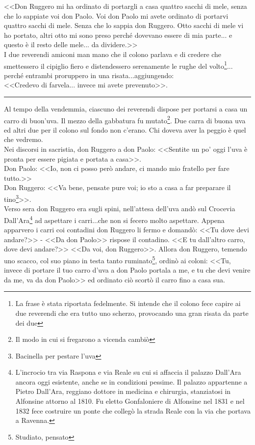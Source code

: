 \indent <<Don Ruggero mi ha ordinato di portargli a casa quattro sacchi di mele, senza che lo sappiate voi don Paolo. Voi don Paolo mi avete ordinato di portarvi quattro sacchi di mele. Senza che lo sappia don Ruggero. Otto sacchi di mele vi ho portato, altri otto mi sono preso perché dovevano essere di mia parte... e questo è il resto delle mele... da dividere.>>\\
I due reverendi amiconi man mano che il colono parlava e di credere che smettessero il cipiglio fiero e distendessero serenamente le rughe del volto\footnote{La frase è stata riportata fedelmente. Si intende che il colono fece capire ai due reverendi che era tutto uno scherzo, provocando una gran risata da parte dei due}... perché entrambi proruppero in una risata...aggiungendo: \\
\indent <<Credevo di farvela... invece mi avete prevenuto>>.
\begin{center}
\rule{1.5cm}{0.4pt}
\end{center}
Al tempo della vendemmia, ciascuno dei reverendi dispose per portarsi a casa un carro di buon'uva. Il mezzo della gabbatura fu mutato\footnote{Il modo in cui si fregarono a vicenda cambiò}. Due carra di buona uva ed altri due per il colono sul fondo non c'erano. Chi doveva aver la peggio è quel che vedremo. \\
Nei discorsi in sacristia, don Ruggero a don Paolo: <<Sentite un po' oggi l'uva è pronta per essere pigiata e portata a casa>>.\\
\indent Don Paolo: <<Io, non ci posso però andare, ci mando mio fratello per fare tutto.>>\\
\indent Don Ruggero: <<Va bene, pensate pure voi; io sto a casa a far preparare il tino\footnote{Bacinella per pestare l'uva}>>.\\
Verso sera don Ruggero era sugli spini, nell'attesa dell'uva andò sul Crocevia Dall'Ara\footnote{L'incrocio tra via Raspona e via Reale su cui si affaccia il palazzo Dall'Ara ancora oggi esistente, anche se in condizioni pessime. Il palazzo appartenne a Pietro Dall'Ara, reggiano dottore in medicina e chirurgia, stanziatosi in Alfonsine attorno al 1810. Fu eletto Gonfaloniere di Alfonsine nel 1831 e nel 1832 fece costruire un ponte che collegò la strada Reale con la via che portava a Ravenna.} ad aspettare i carri...che non si fecero molto aspettare. Appena apparvero i carri coi contadini don Ruggero li fermo e domandò: <<Tu dove devi andare?>> - <<Da don Paolo>> rispose il contadino. <<E tu dall'altro carro, dove devi andare?>> <<Da voi, don Ruggero>>. Allora don Ruggero, temendo uno scacco, col suo piano in testa tanto ruminato\footnote{Studiato, pensato}, ordinò ai coloni: <<Tu, invece di portare il tuo carro d'uva a don Paolo portala a me, e tu che devi venire da me, va da don Paolo>> ed ordinato ciò scortò il carro fino a casa sua.\\
